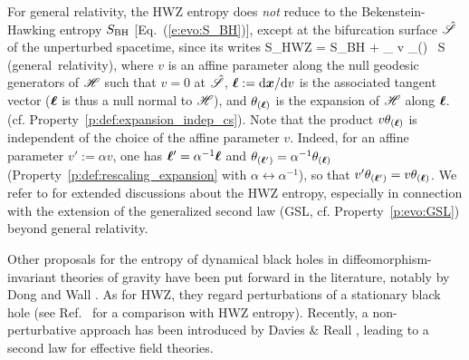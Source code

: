 For general relativity, the HWZ entropy does \emph{not} reduce to the
Bekenstein-Hawking entropy $S_{\rm BH}$ [Eq.~(\ref{e:evo:S_BH})], except
at the bifurcation surface $\hat{\mathscr{S}}$ of the unperturbed spacetime, since its writes
\be
    S_{\rm HWZ} = S_{\rm BH} + 
        \int_{\Sp} v \theta_{(\wl)} \, \D S  \qquad \mbox{(general relativity)},
\ee
where $v$ is an affine parameter along the null geodesic generators of $\mathscr{H}$
such that $v=0$ at $\hat{\mathscr{S}}$,
$\bm{\ell} := \mathrm{d}\bm{x}/\mathrm{d} v$ is the associated tangent vector ($\bm{\ell}$ is thus a null normal to $\mathscr{H}$),
and $\theta_{(\bm{\ell})}$ is the expansion of $\mathscr{H}$ along $\bm{\ell}$.
(cf. Property~\ref{p:def:expansion_indep_cs}). Note that the product
$v \theta_{(\bm{\ell})}$ is independent of the choice of the affine parameter $v$.
Indeed, for an affine parameter $v' := \alpha v$, one has $\bm{\ell}' = \alpha^{-1}  \bm{\ell}$ and
$\theta_{(\bm{\ell}')} = \alpha^{-1} \theta_{(\bm{\ell})}$ (Property~\ref{p:def:rescaling_expansion}
with $\alpha\leftrightarrow \alpha^{-1}$), so that $v' \theta_{(\bm{\ell}')} = v \theta_{(\bm{\ell})}$.
We refer to \cite{Wald25,VisseY24} for extended discussions about the HWZ entropy, especially
in connection with the extension of the generalized second law (GSL, cf. Property~\ref{p:evo:GSL}) beyond general relativity.

Other proposals for the entropy of dynamical black holes in diffeomorphism-invariant
theories of gravity have been put forward in the literature, notably by
Dong \cite{Dong14} and Wall \cite{Wall15}. As for HWZ, they regard perturbations
of a stationary black hole (see Ref.~\cite{HollaWZ24,VisseY24} for a
comparison with HWZ entropy).
Recently, a non-perturbative approach has been
introduced by Davies \& Reall \cite{DavieR24}, leading to a second law
for effective field theories.



